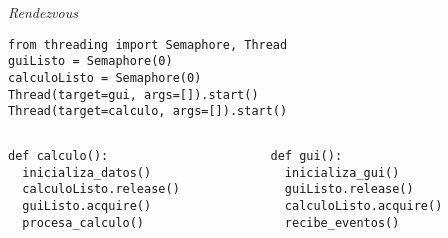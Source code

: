 \documentclass[presentation]{beamer}
\begin{document}
\begin{frame}[label={sec:org3e9198f},fragile]{\emph{Rendezvous}}
 \begin{verbatim}
from threading import Semaphore, Thread
guiListo = Semaphore(0)
calculoListo = Semaphore(0)
Thread(target=gui, args=[]).start()
Thread(target=calculo, args=[]).start()
\end{verbatim}
\begin{columns}\begin{column}{0.5\textwidth}
\begin{verbatim}
def calculo():
  inicializa_datos()
  calculoListo.release()
  guiListo.acquire()
  procesa_calculo()
\end{verbatim}
\end{column} \begin{column}{0.5\textwidth}
\begin{verbatim}
def gui():
  inicializa_gui()
  guiListo.release()
  calculoListo.acquire()
  recibe_eventos()
\end{verbatim}
\end{column}\end{columns}
\end{frame}
\end{document}
